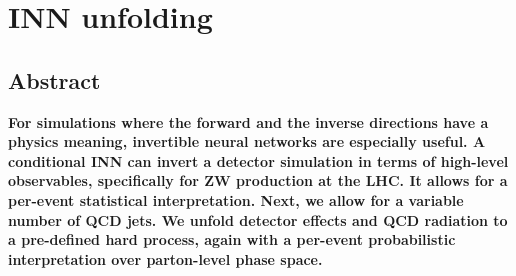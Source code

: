 %
%
%

\chapter{INN unfolding}\label{chap:inn}
\enlargethispage{2ex}
\vspace*{-2pt}

\enlargethispage{2ex}

\section*{Abstract}
{\bf For simulations where the forward and the inverse directions have
  a physics meaning, invertible neural networks are especially useful.
  A conditional INN can invert a detector simulation in terms of
  high-level observables, specifically for ZW production at the
  LHC. It allows for a per-event statistical interpretation. Next, we
  allow for a variable number of QCD jets. We unfold detector effects
  and QCD radiation to a pre-defined hard process, again with a
  per-event probabilistic interpretation over parton-level phase
  space.}

%
